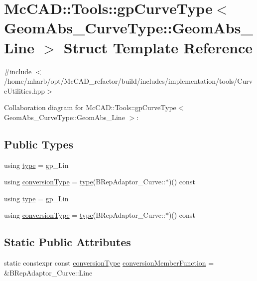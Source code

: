 \hypertarget{structMcCAD_1_1Tools_1_1gpCurveType_3_01GeomAbs__CurveType_1_1GeomAbs__Line_01_4}{}\section{Mc\+C\+AD\+:\+:Tools\+:\+:gp\+Curve\+Type$<$ Geom\+Abs\+\_\+\+Curve\+Type\+:\+:Geom\+Abs\+\_\+\+Line $>$ Struct Template Reference}
\label{structMcCAD_1_1Tools_1_1gpCurveType_3_01GeomAbs__CurveType_1_1GeomAbs__Line_01_4}


{\ttfamily \#include $<$/home/mharb/opt/\+Mc\+C\+A\+D\+\_\+refactor/build/includes/implementation/tools/\+Curve\+Utilities.\+hpp$>$}



Collaboration diagram for Mc\+C\+AD\+:\+:Tools\+:\+:gp\+Curve\+Type$<$ Geom\+Abs\+\_\+\+Curve\+Type\+:\+:Geom\+Abs\+\_\+\+Line $>$\+:
\subsection*{Public Types}
\begin{DoxyCompactItemize}
\item 
using \hyperlink{structMcCAD_1_1Tools_1_1gpCurveType_3_01GeomAbs__CurveType_1_1GeomAbs__Line_01_4_a5a405282c134eac447eea3fd3e9278e6}{type} = gp\+\_\+\+Lin
\item 
using \hyperlink{structMcCAD_1_1Tools_1_1gpCurveType_3_01GeomAbs__CurveType_1_1GeomAbs__Line_01_4_af5227152ea516936523a4a448a96723c}{conversion\+Type} = \hyperlink{structMcCAD_1_1Tools_1_1gpCurveType_3_01GeomAbs__CurveType_1_1GeomAbs__Line_01_4_a5a405282c134eac447eea3fd3e9278e6}{type}(B\+Rep\+Adaptor\+\_\+\+Curve\+::$\ast$)() const
\item 
using \hyperlink{structMcCAD_1_1Tools_1_1gpCurveType_3_01GeomAbs__CurveType_1_1GeomAbs__Line_01_4_a5a405282c134eac447eea3fd3e9278e6}{type} = gp\+\_\+\+Lin
\item 
using \hyperlink{structMcCAD_1_1Tools_1_1gpCurveType_3_01GeomAbs__CurveType_1_1GeomAbs__Line_01_4_af5227152ea516936523a4a448a96723c}{conversion\+Type} = \hyperlink{structMcCAD_1_1Tools_1_1gpCurveType_3_01GeomAbs__CurveType_1_1GeomAbs__Line_01_4_a5a405282c134eac447eea3fd3e9278e6}{type}(B\+Rep\+Adaptor\+\_\+\+Curve\+::$\ast$)() const
\end{DoxyCompactItemize}
\subsection*{Static Public Attributes}
\begin{DoxyCompactItemize}
\item 
static constexpr const \hyperlink{structMcCAD_1_1Tools_1_1gpCurveType_3_01GeomAbs__CurveType_1_1GeomAbs__Line_01_4_af5227152ea516936523a4a448a96723c}{conversion\+Type} \hyperlink{structMcCAD_1_1Tools_1_1gpCurveType_3_01GeomAbs__CurveType_1_1GeomAbs__Line_01_4_a596f8f61934665b19524601d4534c278}{conversion\+Member\+Function} = \&B\+Rep\+Adaptor\+\_\+\+Curve\+::\+Line
\end{DoxyCompactItemize}


